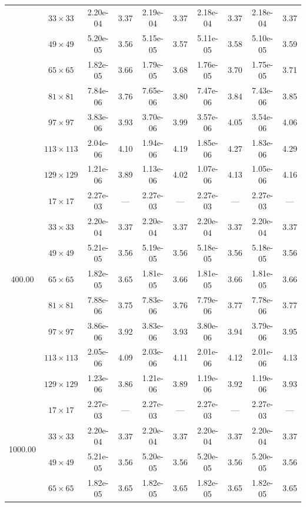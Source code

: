 \documentclass[preprint, 12pt]{elsarticle}
\begin{document}
\begin{center}
\begin{table}[H]
{\begin{tabular*}{\textwidth}{@{\extracolsep\fill}cccccccccc@{}}
    & $33\times 33$ & 2.20e-04 & 3.37 & 2.19e-04 & 3.37 & 2.18e-04 & 3.37 & 2.18e-04 & 3.37 \\
    & $49\times 49$ & 5.20e-05 & 3.56 & 5.15e-05 & 3.57 & 5.11e-05 & 3.58 & 5.10e-05 & 3.59 \\
    & $65\times 65$ & 1.82e-05 & 3.66 & 1.79e-05 & 3.68 & 1.76e-05 & 3.70 & 1.75e-05 & 3.71 \\
    & $81\times 81$ & 7.84e-06 & 3.76 & 7.65e-06 & 3.80 & 7.47e-06 & 3.84 & 7.43e-06 & 3.85 \\
    & $97\times 97$ & 3.83e-06 & 3.93 & 3.70e-06 & 3.99 & 3.57e-06 & 4.05 & 3.54e-06 & 4.06 \\
    & $113\times 113$ & 2.04e-06 & 4.10 & 1.94e-06 & 4.19 & 1.85e-06 & 4.27 & 1.83e-06 & 4.29 \\
    & $129\times 129$ & 1.21e-06 & 3.89 & 1.13e-06 & 4.02 & 1.07e-06 & 4.13 & 1.05e-06 & 4.16 \\
    \hline\hline
    \multirow{7}{*}{400.00} & $17\times 17$ & 2.27e-03 & --- & 2.27e-03 & --- & 2.27e-03 & --- & 2.27e-03 & --- \\
    & $33\times 33$ & 2.20e-04 & 3.37 & 2.20e-04 & 3.37 & 2.20e-04 & 3.37 & 2.20e-04 & 3.37 \\
    & $49\times 49$ & 5.21e-05 & 3.56 & 5.19e-05 & 3.56 & 5.18e-05 & 3.56 & 5.18e-05 & 3.56 \\
    & $65\times 65$ & 1.82e-05 & 3.65 & 1.81e-05 & 3.66 & 1.81e-05 & 3.66 & 1.81e-05 & 3.66 \\
    & $81\times 81$ & 7.88e-06 & 3.75 & 7.83e-06 & 3.76 & 7.79e-06 & 3.77 & 7.78e-06 & 3.77 \\
    & $97\times 97$ & 3.86e-06 & 3.92 & 3.83e-06 & 3.93 & 3.80e-06 & 3.94 & 3.79e-06 & 3.95 \\
    & $113\times 113$ & 2.05e-06 & 4.09 & 2.03e-06 & 4.11 & 2.01e-06 & 4.12 & 2.01e-06 & 4.13 \\
    & $129\times 129$ & 1.23e-06 & 3.86 & 1.21e-06 & 3.89 & 1.19e-06 & 3.92 & 1.19e-06 & 3.93 \\
    \hline\hline
    \multirow{7}{*}{1000.00} & $17\times 17$ & 2.27e-03 & --- & 2.27e-03 & --- & 2.27e-03 & --- & 2.27e-03 & --- \\
    & $33\times 33$ & 2.20e-04 & 3.37 & 2.20e-04 & 3.37 & 2.20e-04 & 3.37 & 2.20e-04 & 3.37 \\
    & $49\times 49$ & 5.21e-05 & 3.56 & 5.20e-05 & 3.56 & 5.20e-05 & 3.56 & 5.20e-05 & 3.56 \\
    & $65\times 65$ & 1.82e-05 & 3.65 & 1.82e-05 & 3.65 & 1.82e-05 & 3.65 & 1.82e-05 & 3.65 \\

\end{tabular*}}
\end{table}
\end{center}
\end{document}
